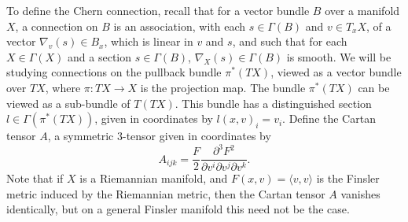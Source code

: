 To define the Chern connection, recall that for a vector bundle $B$ over a manifold $X$, a connection on $B$ is an association, with each $s \in \Gamma(B)$ and $v \in T_x X$, of a vector $\nabla_v(s) \in B_x$, which is linear in $v$ and $s$, and such that for each $X \in \Gamma(X)$ and a section $s \in \Gamma(B)$, $\nabla_X(s) \in \Gamma(B)$ is smooth. We will be studying connections on the pullback bundle $\pi^*(TX)$, viewed as a vector bundle over $TX$, where $\pi: TX \to X$ is the projection map. The bundle $\pi^*(TX)$ can be viewed as a sub-bundle of $T(TX)$. This bundle has a distinguished section $l \in \Gamma(\pi^*(TX))$, given in coordinates by $l(x,v)_i = v_i$. Define the Cartan tensor $A$, a symmetric 3-tensor given in coordinates by
%
\begin{equation}
  A_{ijk} = \frac{F}{2} \frac{\partial^3 F^2}{\partial v^i \partial v^j \partial v^k}. 
\end{equation}
%
Note that if $X$ is a Riemannian manifold, and $F(x,v) = \langle v,v \rangle$ is the Finsler metric induced by the Riemannian metric, then the Cartan tensor $A$ vanishes identically, but on a general Finsler manifold this need not be the case.

